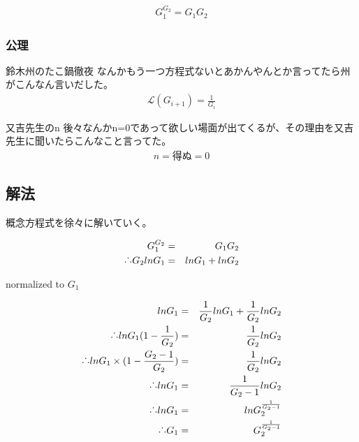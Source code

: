 \begin{eqnarray}
G_{1}^{G_{2}}=G_{1}G_{2}
\end{eqnarray}

\subsubsection{公理}
\begin{itembox}[c]{鈴木州のたこ鍋徹夜}
なんかもう一つ方程式ないとあかんやんとか言ってたら州がこんなん言いだした。
\begin{eqnarray}
\mathcal{L}(G_{i+1})=\frac{1}{G_{i}}
\end{eqnarray}
\end{itembox}

\begin{itembox}[c]{又吉先生のn}
後々なんかn=0であって欲しい場面が出てくるが、その理由を又吉先生に聞いたらこんなこと言ってた。
\begin{eqnarray}
n = 得ぬ = 0
\end{eqnarray}
\end{itembox}

\newpage
\subsection{解法}
概念方程式を徐々に解いていく。

\begin{eqnarray}
G_{1}^{G_{2}}&=&G_{1}G_{2}\\
\raisebox{.2ex}{.}\raisebox{1.2ex}{.}\raisebox{.2ex}{.}  G_{2}ln{G_{1}}&=&ln{G_{1}}+ln{G_{2}}\\
\end{eqnarray}

normalized to $G_{1}$

\begin{eqnarray}
ln{G_{1}}&=&\frac{1}{G_{2}}ln{G_{1}}+\frac{1}{G_{2}}ln{G_{2}}\\
\raisebox{.2ex}{.}\raisebox{1.2ex}{.}\raisebox{.2ex}{.} ln{G_{1}}(1-\frac{1}{G_{2}})&=&\frac{1}{G_{2}}ln{G_{2}}\\
\raisebox{.2ex}{.}\raisebox{1.2ex}{.}\raisebox{.2ex}{.} ln{G_{1}}\times (1-\frac{G_{2}-1}{G_{2}})&=&\frac{1}{G_{2}}ln{G_{2}}\\
\raisebox{.2ex}{.}\raisebox{1.2ex}{.}\raisebox{.2ex}{.} ln{G_{1}}&=&\frac{1}{G_{2}-1}ln{G_{2}}\\
\raisebox{.2ex}{.}\raisebox{1.2ex}{.}\raisebox{.2ex}{.} ln{G_{1}}&=&ln{G_{2}^{\frac{1}{G_{2}-1}}}\\
\raisebox{.2ex}{.}\raisebox{1.2ex}{.}\raisebox{.2ex}{.} G_{1}&=&G_{2}^{\frac{1}{G_{2}-1}}
 \end{eqnarray}

